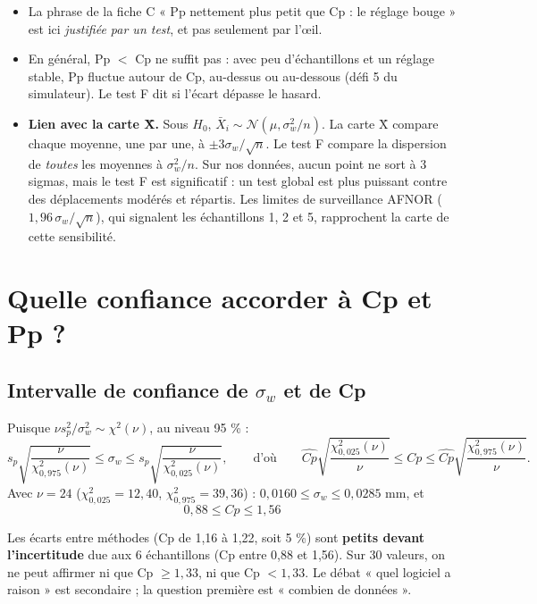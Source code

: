 \documentclass[11pt,a4paper]{article}
\theoremstyle{tq}
\theoremstyle{remark}
\newcommand{\Xb}{\bar{X}}
\newcommand{\sw}{\sigma_w}
\begin{document}
\begin{itemize}[nosep]
\item La phrase de la fiche C « Pp nettement plus petit que Cp : le réglage bouge » est ici \emph{justifiée par un test}, et pas seulement par l'œil.
\item En général, Pp $<$ Cp ne suffit pas : avec peu d'échantillons et un réglage stable, Pp fluctue autour de Cp, au-dessus ou au-dessous (défi 5 du simulateur). Le test F dit si l'écart dépasse le hasard.
\item \textbf{Lien avec la carte X̄.} Sous $H_0$, $\Xb_i \sim\mathcal N(\mu,\sw^2/n)$. La carte X̄ compare chaque moyenne, une par une, à $\pm 3\sw/\sqrt n$. Le test F compare la dispersion de \emph{toutes} les moyennes à $\sw^2/n$. Sur nos données, aucun point ne sort à 3 sigmas, mais le test F est significatif : un test global est plus puissant contre des déplacements modérés et répartis. Les limites de surveillance AFNOR ($1{,}96\,\sw/\sqrt n$), qui signalent les échantillons 1, 2 et 5, rapprochent la carte de cette sensibilité.
\end{itemize}

\section{Quelle confiance accorder à Cp et Pp ?}

\subsection{Intervalle de confiance de $\sw$ et de Cp}

Puisque $\nu s_p^2/\sw^2 \sim\chi^2(\nu)$, au niveau 95 \% :
\[
s_p\sqrt{\frac{\nu}{\chi^2_{0{,}975}(\nu)}} \leq \sw \leq s_p\sqrt{\frac{\nu}{\chi^2_{0{,}025}(\nu)}},
\qquad\text{d'où}\qquad
\widehat{Cp}\sqrt{\frac{\chi^2_{0{,}025}(\nu)}{\nu}}\leq Cp\leq \widehat{Cp}\sqrt{\frac{\chi^2_{0{,}975}(\nu)}{\nu}} .
\]
Avec $\nu=24$ ($\chi^2_{0{,}025}=12{,}40$, $\chi^2_{0{,}975}=39{,}36$) : $0{,}0160\le\sw\le0{,}0285$ mm, et
\[
\boxed{\,0{,}88 \leq Cp \leq 1{,}56\,}
\]

\begin{cle}
Les écarts entre méthodes (Cp de 1,16 à 1,22, soit 5 \%) sont \textbf{petits devant l'incertitude} due aux 6 échantillons (Cp entre 0,88 et 1,56). Sur 30 valeurs, on ne peut affirmer ni que Cp $\geq 1{,}33$, ni que Cp $<1{,}33$. Le débat « quel logiciel a raison » est secondaire ; la question première est « combien de données ».
\end{cle}
\end{document}
